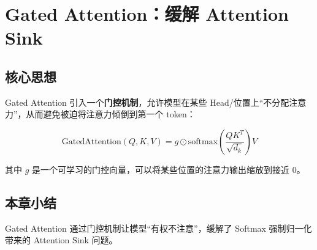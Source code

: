 \section{Gated Attention：缓解 Attention Sink}

\subsection{核心思想}

Gated Attention 引入一个\textbf{门控机制}，允许模型在某些 Head/位置上``不分配注意力''，从而避免被迫将注意力倾倒到第一个 token：

$$
\text{GatedAttention}(Q, K, V) = g \odot \text{softmax}\left(\frac{QK^T}{\sqrt{d_k}}\right) V
$$

其中 $g$ 是一个可学习的门控向量，可以将某些位置的注意力输出缩放到接近 0。

\subsection{本章小结}

Gated Attention 通过门控机制让模型``有权不注意''，缓解了 Softmax 强制归一化带来的 Attention Sink 问题。

